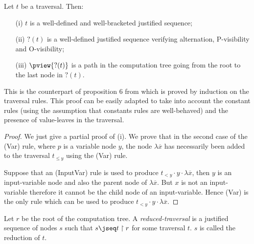 \begin{prop}
\label{prop:pviewtrav_is_path}
Let $t$ be a traversal. Then:
\begin{itemize}
\item[(i)] $t$ is a well-defined and well-bracketed justified sequence;
\item[(ii)] $?(t)$ is a well-defined justified sequence verifying alternation, P-visibility and O-visibility;
\item[(iii)] $\pview{?(t)}$ is a path in the computation tree going from the root to the last node in $?(t)$.
\end{itemize}
\end{prop}
This is the counterpart of proposition 6 from
\cite{OngHoMchecking2006} which is proved by induction on the
traversal rules. This proof can be easily adapted to take into
account the constant rules (using the assumption that constants
rules are well-behaved) and the presence of value-leaves in the
traversal.
\begin{proof}
We just give a partial proof of (i). We prove that in the second case of the (Var) rule, where $p$ is a variable node $y$,
the node $\lambda \overline{x}$ has necessarily been added to the traversal $t_{\leq y}$ using the (Var) rule.

Suppose that an (InputVar) rule is used to produce $t_{<y} \cdot y
\cdot \lambda \overline{x}$, then $y$ is an input-variable node and
also the parent node of $\lambda \overline{x}$. But $x$ is not an
input-variable therefore it cannot be the child node of an
input-variable. Hence (Var) is the only rule which can be used to
produce $t_{<y} \cdot y \cdot \lambda \overline{x}$.
\end{proof}



\begin{dfn}
Let $r$ be the root of the computation tree. A \emph{reduced-traversal} is a justified sequence of nodes $s$ such that
$s \jseq t \upharpoonright r$ for some traversal $t$. $s$ is called the reduction of $t$.
\end{dfn}

